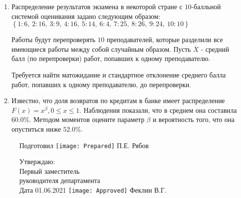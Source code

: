 \documentclass[a4paper,12pt]{article}
\begin{document}
\begin{enumerate}
\item

    
    	Распределение результатов экзамена в некоторой стране с $10$-балльной системой оценивания задано следующим образом:
    	$\left\{ 1 : 6, \  2 : 16, \  3 : 9, \  4 : 16, \  5 : 14, \  6 : 4, \  7 : 25, \  8 : 26, \  9 : 24, \  10 : 10\right\}$

	Работы будут перепроверять $10$ преподавателей, которые разделили все имеющиеся работы между собой случайным образом. Пусть $\overline{X}$ - средний балл (по перепроверки) работ, попавших к одному преподавателю.

	Требуется найти матожидание и стандартное отклонение среднего балла работ, попавших к одному преподавателю, до перепроверки.
    

\item

    
	Известно, что доля возвратов по кредитам в банке имеет распределение $F(x) = x^{\beta}, 0 \le x \le 1$. Наблюдения показали, что в среднем она составила $60.0$\%. Методом моментов оцените параметр $\beta$ и вероятность того, что она опуститься ниже $52.0$\%.
	

\end{enumerate}

\begin{figure}[H]
	Подготовил
	\hfill
	\texttt{[image: Prepared]}
	П.Е. Рябов
\end{figure}


\begin{figure}[H]
	Утверждаю:\\
	Первый заместитель\\
	руководителя департамента\\
	Дата 01.06.2021
	\hfill
	\texttt{[image: Approved]}
	Феклин В.Г.
\end{figure}
\end{document}
